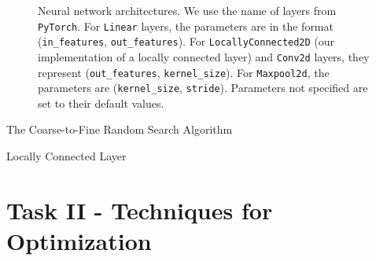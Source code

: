 \documentclass[
	12pt, %
]{../Template/fphw}
\begin{document}
\begin{figure}[!htbp]
\begin{tikzpicture}[x=0.75pt,y=0.75pt,yscale=-1,xscale=1]
\end{tikzpicture}
    \caption{Neural network architectures. We use the name of layers from \texttt{PyTorch}\cite{pytorch}. For \texttt{Linear} layers, the parameters are in the format (\texttt{in\_features}, \texttt{out\_features}). For \texttt{LocallyConnected2D} (our implementation of a locally connected layer) and \texttt{Conv2d} layers, they represent (\texttt{out\_features}, \texttt{kernel\_size}). For \texttt{Maxpool2d}, the parameters are (\texttt{kernel\_size}, \texttt{stride}). Parameters not specified are set to their default values.}
    \label{fig:p1_architectures}

\end{figure}

\begin{algorithm}
        \caption{The Coarse-to-Fine Random Search Algorithm}\label{alg:NAS}
        \begin{algorithmic}
         \State   
        \end{algorithmic}
\end{algorithm}

\begin{algorithm}
        \caption{Locally Connected Layer}\label{alg:Locallyconn}
        \begin{algorithmic}
         \State   
        \end{algorithmic}
\end{algorithm}


\section*{Task II - Techniques for Optimization}
\end{document}
